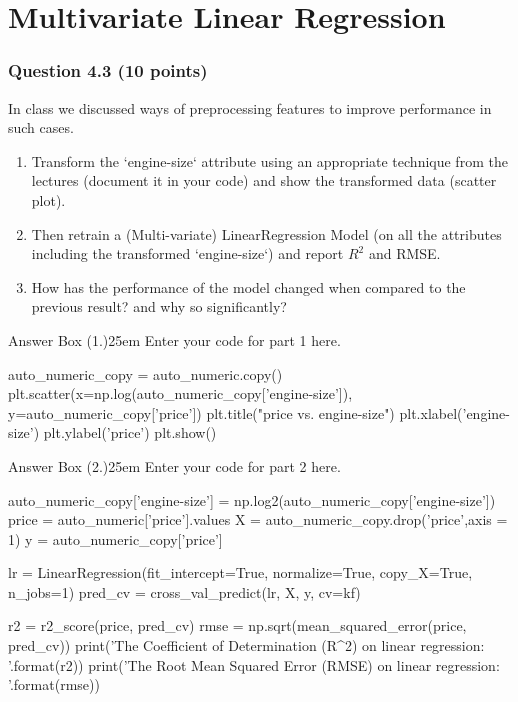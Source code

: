 \documentclass[12pt]{article}
\begin{document}




% 


\section*{Multivariate Linear Regression}
\subsubsection*{Question 4.3 (10 points)}
In class we discussed ways of preprocessing features to improve performance in such cases.
\begin{enumerate}
    \item [1.] [Code] Transform the `engine-size` attribute using an appropriate technique from the lectures (document it in your code) and show the transformed data (scatter plot).
    \item [2.] [Code] Then retrain a (Multi-variate) LinearRegression Model (on all the attributes including the transformed `engine-size`) and report $R^2$ and RMSE. 
    \item [3.] [Text] How has the performance of the model changed when compared to the previous result? and why so significantly?
\end{enumerate}

\begin{code}{Answer Box (1.)}{25em}
    Enter your code for part 1 here.

    auto_numeric_copy = auto_numeric.copy()
    plt.scatter(x=np.log(auto_numeric_copy['engine-size']), y=auto_numeric_copy['price'])
    plt.title("price vs. engine-size")
    plt.xlabel('engine-size')
    plt.ylabel('price')
    plt.show()
    
\end{code}


\begin{code}{Answer Box (2.)}{25em}
    Enter your code for part 2 here.

    auto_numeric_copy['engine-size'] = np.log2(auto_numeric_copy['engine-size'])
    price = auto_numeric['price'].values
    X = auto_numeric_copy.drop('price',axis = 1)
    y = auto_numeric_copy['price']
    
    lr = LinearRegression(fit_intercept=True, normalize=True, copy_X=True, n_jobs=1)
    pred_cv = cross_val_predict(lr, X, y, cv=kf)

    r2 = r2_score(price, pred_cv)
    rmse = np.sqrt(mean_squared_error(price, pred_cv))
    print('The Coefficient of Determination (R^2) on linear regression: {}'.format(r2))
    print('The Root Mean Squared Error (RMSE) on linear regression: {}'.format(rmse))
\end{code}
\end{document}
